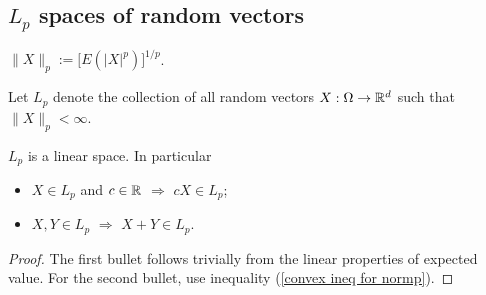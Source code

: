 




%
%
\subsection{$L_p$ spaces of random vectors}



\begin{definition}[{\bf $L_p$ norm}]
$\|X\|_p:= \bigl[E(|X|^p)\bigr]^{1/p}$.
\end{definition}



\begin{definition}[{\bf $L_p$ space}]
Let $L_p$ denote the collection of all random vectors  $X:\Omega \rightarrow \Bbb R^d$ such that $\| X \|_p<\infty$.
\end{definition}

\begin{theorem}
$L_p$ is a linear space. In particular
\begin{itemize}
\item $X\in L_p$ and $c\in \Bbb R$ $\Longrightarrow$  $cX \in L_p$;
\item $X, Y\in L_p$ $\Longrightarrow$  $X + Y \in L_p$.
\end{itemize}
\end{theorem}
\begin{proof}
The first bullet  follows trivially from the  linear properties of expected value. For the second bullet, use inequality (\ref{convex ineq for normp}).
\end{proof}


